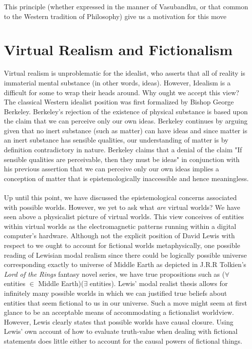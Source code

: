 This principle (whether expressed in the manner of Vasubandhu, or that common to the Western tradition of Philosophy) give us a motivation for this move


\section{Virtual Realism and Fictionalism}
Virtual realism is unproblematic for the idealist, who asserts that all of reality is immaterial mental substance (in other words, ideas). However, Idealism is a difficult for some to wrap their heads around. Why ought we accept this view? The classical Western idealist position was first formalized by Bishop George Berkeley. Berkeley's rejection of the existence of physical substance is based upon the claim that we can perceive only our own ideas. Berkeley continues by arguing given that no inert substance (such as matter) can have ideas and since \textbf{\textit{}}matter is an inert substance has sensible qualities, our understanding of matter is by definition contradictory in nature. Berkeley claims that a denial of the claim "If sensible qualities are perceivable, then they must be ideas" in conjunction with his previous assertion that we can perceive only our own ideas implies a conception of matter that is epistemologically inaccessible and hence meaningless. \cite{berkeley2003a}
\\


 \\
 
  
 
Up until this point, we have discussed the epistemological concerns associated with possible worlds. However, we yet to ask what \textit{are} virtual worlds? We have seen above a physicalist picture of virtual worlds. This view conceives of entities within virtual worlds as the electromagnetic patterns running within a digital computer's hardware. 
Although not the explicit position of David Lewis with respect to we ought to account for fictional worlds metaphysically, one possible reading of Lewisian modal realism  since there could be logically possible universe corresponding exactly to universe of Middle Earth as depicted in J.R.R Tolkien's \textit{Lord of the Rings} fantasy novel series, we have true propositions such as ($\forall $entities $\in$ Middle Earth)($\exists$ entities). Lewis' modal realist thesis allows for infinitely many possible worlds in which we can justified true beliefs about entities that seem fictional to us in our universe. Such a move might seem at first glance to be an acceptable means of 
accommodating a fictionalist worldview. However, Lewis clearly states that possible worlds have causal closure. Using Lewis' own account of how to evaluate truth-value when dealing with fictional statements does little either to account for the causal powers of fictional things.  



